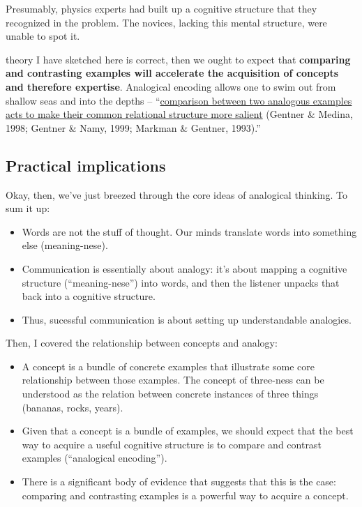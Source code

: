 Presumably, physics experts had built up a cognitive
structure that they recognized in the problem. The novices, lacking this
mental structure, were unable to spot it.

 theory I have sketched here is correct, then we ought to expect
that \textbf{comparing and contrasting examples will accelerate the
acquisition of concepts and therefore expertise}. Analogical encoding
allows one to swim out from shallow seas and into the depths --
``\href{http://onlinelibrary.wiley.com/doi/10.1111/j.1551-6709.2009.01070.x/full}{comparison
between two analogous examples acts to make their common relational
structure more salient} (Gentner \& Medina, 1998; Gentner \& Namy, 1999;
Markman \& Gentner, 1993).''

\subsection{Practical implications}\label{practical-implications}

Okay, then, we've just breezed through the core ideas of analogical
thinking. To sum it up:

\begin{itemize}
\itemsep1pt\parskip0pt
\item
  Words are not the stuff of thought. Our minds translate words into
  something else (meaning-nese).
\item
  Communication is essentially about analogy: it's about mapping a
  cognitive structure (``meaning-nese'') into words, and then the
  listener unpacks that back into a cognitive structure.
\item
  Thus, sucessful communication is about setting up understandable
  analogies.
\end{itemize}

Then, I covered the relationship between concepts and analogy:

\begin{itemize}
\itemsep1pt\parskip0pt
\item
  A concept is a bundle of concrete examples that illustrate some core
  relationship between those examples. The concept of three-ness can be
  understood as the relation between concrete instances of three things
  (bananas, rocks, years).
\item
  Given that a concept is a bundle of examples, we should expect that
  the best way to acquire a useful cognitive structure is to compare and
  contrast examples (``analogical encoding'').
\item
  There is a significant body of evidence that suggests that this is the
  case: comparing and contrasting examples is a powerful way to acquire
  a concept.
\end{itemize}

